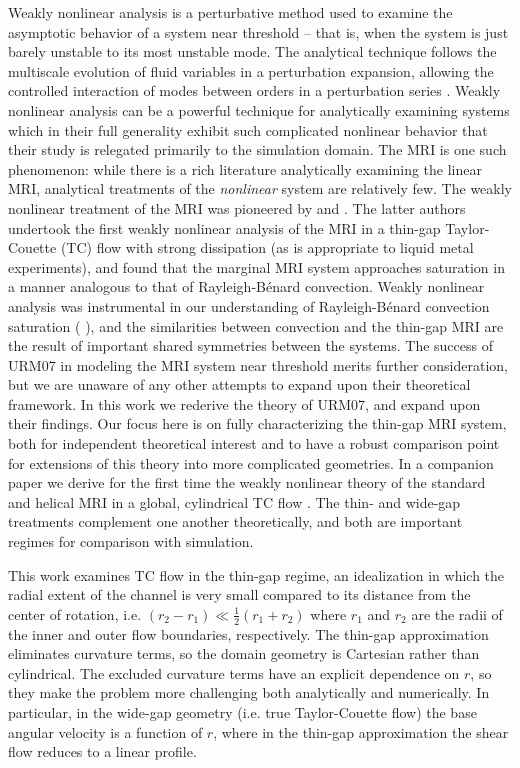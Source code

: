 \documentclass{emulateapj}
\newcommand{\citei}[1]{\citeauthor{#1} \citeyear{#1}}
\begin{document}
Weakly nonlinear analysis is a perturbative method used to examine the asymptotic behavior of a system near threshold -- that is, when the system is just barely unstable to its most unstable mode. The analytical technique follows the multiscale evolution of fluid variables in a perturbation expansion, allowing the controlled interaction of modes between orders in a perturbation series \citep{1978amms.book.....B}. Weakly nonlinear analysis can be a powerful technique for analytically examining systems which in their full generality exhibit such complicated nonlinear behavior that their study is relegated primarily to the simulation domain. The MRI is one such phenomenon: while there is a rich literature analytically examining the linear MRI, analytical treatments of the \textit{nonlinear} system are relatively few. The weakly nonlinear treatment of the MRI was pioneered by \citet{Knobloch:2005ba} and \citet[][hereafter URM07; see also \citeyear{Umurhan:2007dz}]{Umurhan:2007hs}. The latter authors undertook the first weakly nonlinear analysis of the MRI in a thin-gap Taylor-Couette (TC) flow with strong dissipation (as is appropriate to liquid metal experiments), and found that the marginal MRI system approaches saturation in a manner analogous to that of Rayleigh-B\'enard convection. Weakly nonlinear analysis was instrumental in our understanding of Rayleigh-B\'enard convection saturation (\citei{Newell:1969}), and the similarities between convection and the thin-gap MRI are the result of important shared symmetries between the systems. The success of URM07 in modeling the MRI system near threshold merits further consideration, but we are unaware of any other attempts to expand upon their theoretical framework. In this work we rederive the theory of URM07, and expand upon their findings. Our focus here is on fully characterizing the thin-gap MRI system, both for independent theoretical interest and to have a robust comparison point for extensions of this theory into more complicated geometries. In a companion paper we derive for the first time the weakly nonlinear theory of the standard and helical MRI in a global, cylindrical TC flow \citep[][hereafter Paper II]{Clark:2016}. The thin- and wide-gap treatments complement one another theoretically, and both are important regimes for comparison with simulation. 

This work examines TC flow in the thin-gap regime, an idealization in which the radial extent of the channel is very small compared to its distance from the center of rotation, i.e. $(r_2 - r_1) \ll \frac{1}{2} (r_1 + r_2)$ where $r_1$ and $r_2$ are the radii of the inner and outer flow boundaries, respectively. The thin-gap approximation eliminates curvature terms, so the domain geometry is Cartesian rather than cylindrical. The excluded curvature terms have an explicit dependence on $r$, so they make the problem more challenging both analytically and numerically. In particular, in the wide-gap geometry (i.e. true Taylor-Couette flow) the base angular velocity is a function of $r$, where in the thin-gap approximation the shear flow reduces to a linear profile.
\end{document}
